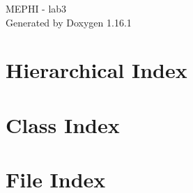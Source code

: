 \documentclass[twoside]{book}
\newcommand{\+}{\discretionary{\mbox{\scriptsize$\hookleftarrow$}}{}{}}
\newcommand{\clearemptydoublepage}{%
    \newpage{\pagestyle{empty}\cleardoublepage}%
  }
\begin{document}
  \raggedbottom
    \hypersetup{pageanchor=false,
                bookmarksnumbered=true,
                pdfencoding=unicode
               }
  \begin{titlepage}
  \vspace*{7cm}
  \begin{center}%
  {\Large MEPHI -\/ lab3}\\
  \vspace*{1cm}
  {\large Generated by Doxygen 1.16.1}\\
  \end{center}
  \end{titlepage}
  \clearemptydoublepage
  \tableofcontents
  \clearemptydoublepage
  \hypersetup{pageanchor=true}
\chapter{Hierarchical Index}

\chapter{Class Index}

\chapter{File Index}

\end{document}

